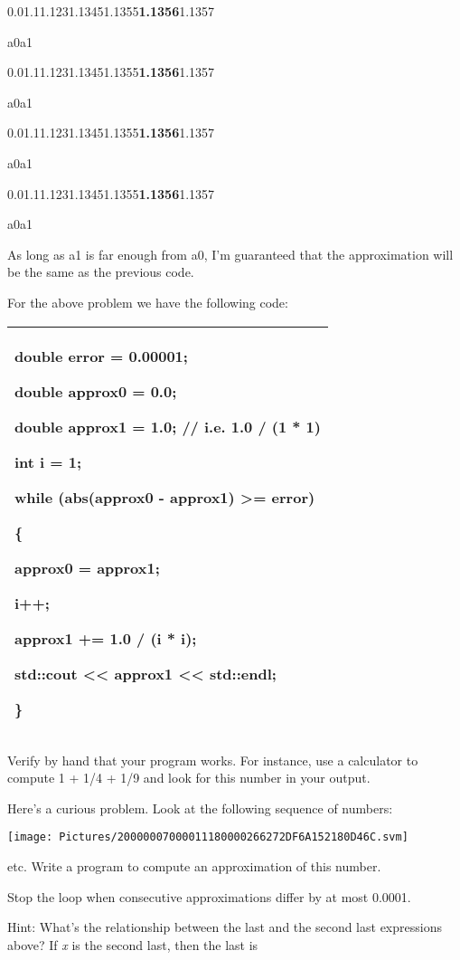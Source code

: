 \documentclass[
]{article}
\begin{document}
0.01.11.1231.13451.1355\textbf{1.1356}1.1357

a0a1

0.01.11.1231.13451.1355\textbf{1.1356}1.1357

a0a1

0.01.11.1231.13451.1355\textbf{1.1356}1.1357

a0a1

0.01.11.1231.13451.1355\textbf{1.1356}1.1357

a0a1

As long as a1 is far enough from a0, I'm guaranteed that the
approximation will be the same as the previous code.

For the above problem we have the following code:

\begin{longtable}[]{@{}l@{}}
\toprule
\endhead
\begin{minipage}[t]{0.97\columnwidth}\raggedright
double error = 0.00001;

double approx0 = 0.0;

double approx1 = 1.0; // i.e. 1.0 / (1 * 1)

int i = 1;

while (abs(approx0 - approx1) \textgreater= error)

\{

approx0 = approx1;

i++;

approx1 += 1.0 / (i * i);

std::cout \textless\textless{} approx1 \textless\textless{} std::endl;

\}\strut
\end{minipage}\tabularnewline
\bottomrule
\end{longtable}

Verify by hand that your program works. For instance, use a calculator
to compute 1 + 1/4 + 1/9 and look for this number in your output.

Here's a curious problem. Look at the following sequence of numbers:

\texttt{[image: Pictures/20000007000011180000266272DF6A152180D46C.svm]}

etc. Write a program to compute an approximation of this number.

Stop the loop when consecutive approximations differ by at most 0.0001.

Hint: What's the relationship between the last and the second last
expressions above? If \emph{x} is the second last, then the last is
\end{document}
